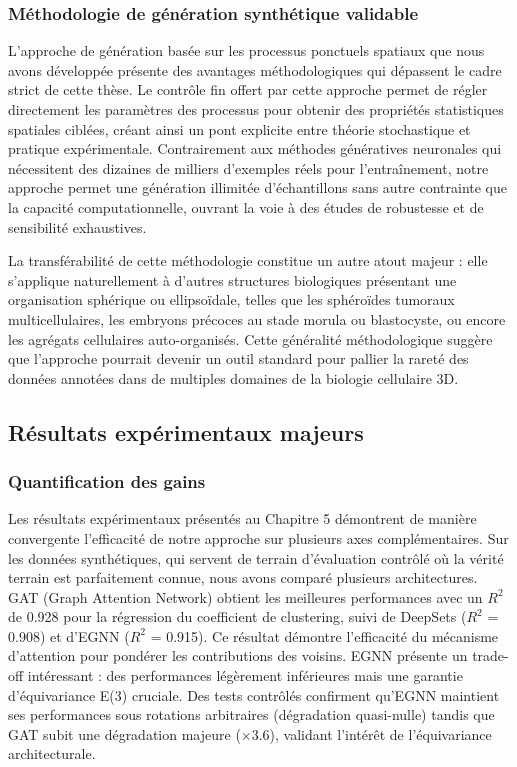 \subsubsection{Méthodologie de génération synthétique validable}

L'approche de génération basée sur les processus ponctuels spatiaux que nous avons développée présente des avantages méthodologiques qui dépassent le cadre strict de cette thèse. Le contrôle fin offert par cette approche permet de régler directement les paramètres des processus pour obtenir des propriétés statistiques spatiales ciblées, créant ainsi un pont explicite entre théorie stochastique et pratique expérimentale. Contrairement aux méthodes génératives neuronales qui nécessitent des dizaines de milliers d'exemples réels pour l'entraînement, notre approche permet une génération illimitée d'échantillons sans autre contrainte que la capacité computationnelle, ouvrant la voie à des études de robustesse et de sensibilité exhaustives. 

La transférabilité de cette méthodologie constitue un autre atout majeur : elle s'applique naturellement à d'autres structures biologiques présentant une organisation sphérique ou ellipsoïdale, telles que les sphéroïdes tumoraux multicellulaires, les embryons précoces au stade morula ou blastocyste, ou encore les agrégats cellulaires auto-organisés. Cette généralité méthodologique suggère que l'approche pourrait devenir un outil standard pour pallier la rareté des données annotées dans de multiples domaines de la biologie cellulaire 3D.

\subsection{Résultats expérimentaux majeurs}

\subsubsection{Quantification des gains}

Les résultats expérimentaux présentés au Chapitre 5 démontrent de manière convergente l'efficacité de notre approche sur plusieurs axes complémentaires. Sur les données synthétiques, qui servent de terrain d'évaluation contrôlé où la vérité terrain est parfaitement connue, nous avons comparé plusieurs architectures. GAT (Graph Attention Network) obtient les meilleures performances avec un $R^2$ de 0.928 pour la régression du coefficient de clustering, suivi de DeepSets ($R^2$ = 0.908) et d'EGNN ($R^2$ = 0.915). Ce résultat démontre l'efficacité du mécanisme d'attention pour pondérer les contributions des voisins. EGNN présente un trade-off intéressant : des performances légèrement inférieures mais une garantie d'équivariance E(3) cruciale. Des tests contrôlés confirment qu'EGNN maintient ses performances sous rotations arbitraires (dégradation quasi-nulle) tandis que GAT subit une dégradation majeure (×3.6), validant l'intérêt de l'équivariance architecturale.

